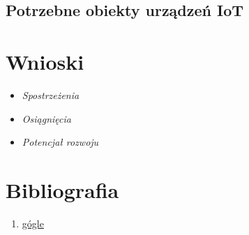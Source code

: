 \documentclass[12pt,a4paper]{article}
\begin{document}
    \subsection{Potrzebne obiekty urządzeń IoT}
\newpage
\section{Wnioski}
	\begin{itemize}
		\item \textit{Spostrzeżenia}
		
		
		\item \textit{Osiągnięcia}
		
		
		\item \textit{Potencjał rozwoju}
		
		
	\end{itemize}





\newpage
\section{Bibliografia}
\begin{enumerate}
	\item \href{google.com}{gógle}
\end{enumerate}
\end{document}
